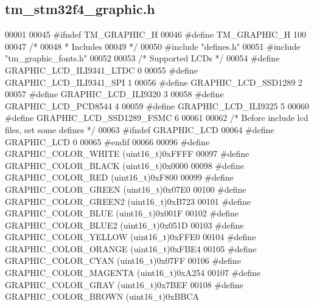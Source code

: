\hypertarget{tm__stm32f4__graphic_8h_source}{}\subsection{tm\+\_\+stm32f4\+\_\+graphic.\+h}

\begin{DoxyCode}
00001 
00045 \textcolor{preprocessor}{#ifndef TM\_GRAPHIC\_H}
00046 \textcolor{preprocessor}{#define TM\_GRAPHIC\_H 100}
00047 \textcolor{comment}{/*}
00048 \textcolor{comment}{ * Includes}
00049 \textcolor{comment}{ */}
00050 \textcolor{preprocessor}{#include "defines.h"}
00051 \textcolor{preprocessor}{#include "tm\_graphic\_fonts.h"}
00052 
00053 \textcolor{comment}{/* Supported LCDs */}
00054 \textcolor{preprocessor}{#define GRAPHIC\_LCD\_ILI9341\_LTDC    0}
00055 \textcolor{preprocessor}{#define GRAPHIC\_LCD\_ILI9341\_SPI     1}
00056 \textcolor{preprocessor}{#define GRAPHIC\_LCD\_SSD1289         2}
00057 \textcolor{preprocessor}{#define GRAPHIC\_LCD\_ILI9320         3}
00058 \textcolor{preprocessor}{#define GRAPHIC\_LCD\_PCD8544         4}
00059 \textcolor{preprocessor}{#define GRAPHIC\_LCD\_ILI9325         5}
00060 \textcolor{preprocessor}{#define GRAPHIC\_LCD\_SSD1289\_FSMC    6}
00061 
00062 \textcolor{comment}{/* Before include lcd files, set some defines */}
00063 \textcolor{preprocessor}{#ifndef GRAPHIC\_LCD}
00064 \textcolor{preprocessor}{#define GRAPHIC\_LCD                 0}
00065 \textcolor{preprocessor}{#endif}
00066 
00096 \textcolor{preprocessor}{#define GRAPHIC\_COLOR\_WHITE         (uint16\_t)0xFFFF}
00097 \textcolor{preprocessor}{#define GRAPHIC\_COLOR\_BLACK         (uint16\_t)0x0000}
00098 \textcolor{preprocessor}{#define GRAPHIC\_COLOR\_RED           (uint16\_t)0xF800}
00099 \textcolor{preprocessor}{#define GRAPHIC\_COLOR\_GREEN         (uint16\_t)0x07E0}
00100 \textcolor{preprocessor}{#define GRAPHIC\_COLOR\_GREEN2        (uint16\_t)0xB723}
00101 \textcolor{preprocessor}{#define GRAPHIC\_COLOR\_BLUE          (uint16\_t)0x001F}
00102 \textcolor{preprocessor}{#define GRAPHIC\_COLOR\_BLUE2         (uint16\_t)0x051D}
00103 \textcolor{preprocessor}{#define GRAPHIC\_COLOR\_YELLOW        (uint16\_t)0xFFE0}
00104 \textcolor{preprocessor}{#define GRAPHIC\_COLOR\_ORANGE        (uint16\_t)0xFBE4}
00105 \textcolor{preprocessor}{#define GRAPHIC\_COLOR\_CYAN          (uint16\_t)0x07FF}
00106 \textcolor{preprocessor}{#define GRAPHIC\_COLOR\_MAGENTA       (uint16\_t)0xA254}
00107 \textcolor{preprocessor}{#define GRAPHIC\_COLOR\_GRAY          (uint16\_t)0x7BEF}
00108 \textcolor{preprocessor}{#define GRAPHIC\_COLOR\_BROWN         (uint16\_t)0xBBCA}

\end{DoxyCode}

